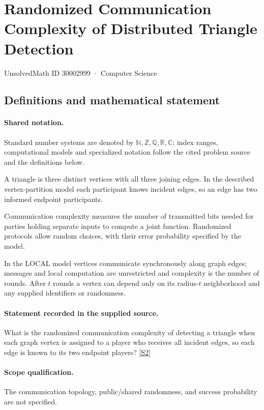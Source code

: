 \documentclass[11pt]{article}
\newcommand{\sref}[2]{\hyperlink{source:#1:#2}{[S#2]}}
\begin{document}
\setcounter{section}{30002998}
\section{Randomized Communication Complexity of Distributed Triangle Detection}\label{30002999}
{\small\sffamily UnsolvedMath ID 30002999 · Computer Science}
\subsection{Definitions and mathematical statement}

\paragraph{Shared notation.}Standard number systems are denoted by $\mathbb N,\mathbb Z,\mathbb Q,\mathbb R,\mathbb C$; index ranges, computational models and specialized notation follow the cited problem source and the definitions below.


A triangle is three distinct vertices with all three joining edges. In the described vertex-partition model each participant knows incident edges, so an edge has two informed endpoint participants.

Communication complexity measures the number of transmitted bits needed for parties holding separate inputs to compute a joint function. Randomized protocols allow random choices, with their error probability specified by the model.

In the LOCAL model vertices communicate synchronously along graph edges; messages and local computation are unrestricted and complexity is the number of rounds. After $t$ rounds a vertex can depend only on its radius-$t$ neighborhood and any supplied identifiers or randomness.
\paragraph{Statement recorded in the supplied source.}
What is the randomized communication complexity of detecting a triangle when each graph vertex is assigned to a player who receives all incident edges, so each edge is known to its two endpoint players? \sref{30002999}{2}
\paragraph{Scope qualification.}
The communication topology, public/shared randomness, and success probability are not specified.
\end{document}
